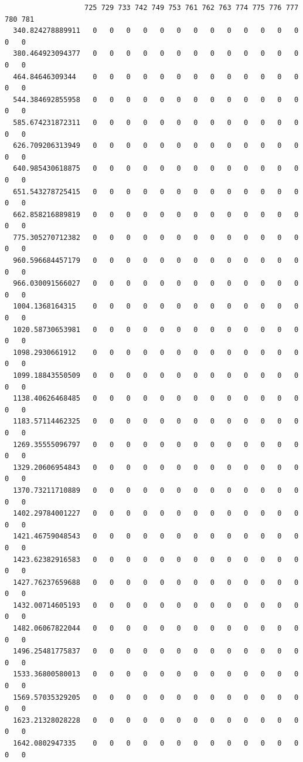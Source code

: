 \documentclass[
  letterpaper,
  DIV=11,
  numbers=noendperiod]{scrartcl}
\begin{document}
\begin{verbatim}
                   725 729 733 742 749 753 761 762 763 774 775 776 777 780 781
  340.824278889911   0   0   0   0   0   0   0   0   0   0   0   0   0   0   0
  380.464923094377   0   0   0   0   0   0   0   0   0   0   0   0   0   0   0
  464.84646309344    0   0   0   0   0   0   0   0   0   0   0   0   0   0   0
  544.384692855958   0   0   0   0   0   0   0   0   0   0   0   0   0   0   0
  585.674231872311   0   0   0   0   0   0   0   0   0   0   0   0   0   0   0
  626.709206313949   0   0   0   0   0   0   0   0   0   0   0   0   0   0   0
  640.985430618875   0   0   0   0   0   0   0   0   0   0   0   0   0   0   0
  651.543278725415   0   0   0   0   0   0   0   0   0   0   0   0   0   0   0
  662.858216889819   0   0   0   0   0   0   0   0   0   0   0   0   0   0   0
  775.305270712382   0   0   0   0   0   0   0   0   0   0   0   0   0   0   0
  960.596684457179   0   0   0   0   0   0   0   0   0   0   0   0   0   0   0
  966.030091566027   0   0   0   0   0   0   0   0   0   0   0   0   0   0   0
  1004.1368164315    0   0   0   0   0   0   0   0   0   0   0   0   0   0   0
  1020.58730653981   0   0   0   0   0   0   0   0   0   0   0   0   0   0   0
  1098.2930661912    0   0   0   0   0   0   0   0   0   0   0   0   0   0   0
  1099.18843550509   0   0   0   0   0   0   0   0   0   0   0   0   0   0   0
  1138.40626468485   0   0   0   0   0   0   0   0   0   0   0   0   0   0   0
  1183.57114462325   0   0   0   0   0   0   0   0   0   0   0   0   0   0   0
  1269.35555096797   0   0   0   0   0   0   0   0   0   0   0   0   0   0   0
  1329.20606954843   0   0   0   0   0   0   0   0   0   0   0   0   0   0   0
  1370.73211710889   0   0   0   0   0   0   0   0   0   0   0   0   0   0   0
  1402.29784001227   0   0   0   0   0   0   0   0   0   0   0   0   0   0   0
  1421.46759048543   0   0   0   0   0   0   0   0   0   0   0   0   0   0   0
  1423.62382916583   0   0   0   0   0   0   0   0   0   0   0   0   0   0   0
  1427.76237659688   0   0   0   0   0   0   0   0   0   0   0   0   0   0   0
  1432.00714605193   0   0   0   0   0   0   0   0   0   0   0   0   0   0   0
  1482.06067822044   0   0   0   0   0   0   0   0   0   0   0   0   0   0   0
  1496.25481775837   0   0   0   0   0   0   0   0   0   0   0   0   0   0   0
  1533.36800580013   0   0   0   0   0   0   0   0   0   0   0   0   0   0   0
  1569.57035329205   0   0   0   0   0   0   0   0   0   0   0   0   0   0   0
  1623.21328028228   0   0   0   0   0   0   0   0   0   0   0   0   0   0   0
  1642.0802947335    0   0   0   0   0   0   0   0   0   0   0   0   0   0   0

\end{verbatim}
\end{document}
